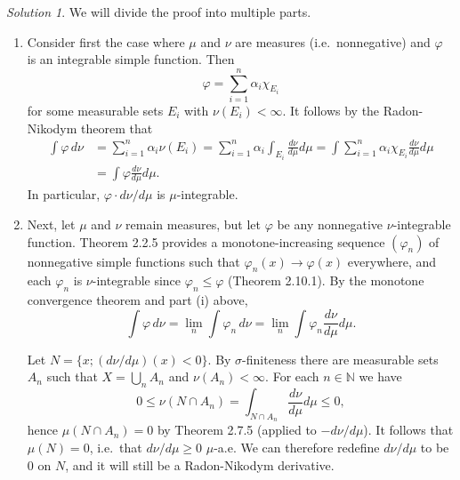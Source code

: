 \documentclass{report}
\newcommand{\bb}[1]{\mathbb{#1}}
\theoremstyle{remark}
\newtheorem*{solution}{Solution}
\begin{document}
\begin{solution}
  We will divide the proof into multiple parts.
  \begin{enumerate}[label=(\roman*)]
    \item Consider first the case where $\mu$ and $\nu$ are measures (i.e.\ nonnegative) and $\varphi$ is an integrable simple function. Then
      \begin{equation*}
        \varphi = \sum_{i=1}^n \alpha_i \chi_{E_i}
      \end{equation*}
      for some measurable sets $E_i$ with $\nu(E_i) < \infty$. It follows by the Radon-Nikodym theorem that
      \begin{equation*}
        \begin{split}
          \int \varphi \, d\nu &= \sum_{i=1}^n \alpha_i \nu(E_i) = \sum_{i=1}^n \alpha_i \int_{E_i} \frac{d\nu}{d\mu} d\mu = \int \sum_{i=1}^n \alpha_i \chi_{E_i} \frac{d\nu}{d\mu} d\mu \\
          &= \int \varphi \frac{d\nu}{d\mu} d\mu.
        \end{split}
      \end{equation*}
      In particular, $\varphi \cdot d\nu/d\mu$ is $\mu$-integrable.

    \item Next, let $\mu$ and $\nu$ remain measures, but let $\varphi$ be any nonnegative $\nu$-integrable function. Theorem 2.2.5 provides a monotone-increasing sequence $(\varphi_n)$ of nonnegative simple functions such that $\varphi_n(x) \to \varphi(x)$ everywhere, and each $\varphi_n$ is $\nu$-integrable since $\varphi_n \le \varphi$ (Theorem 2.10.1). By the monotone convergence theorem and part (i) above,
      \begin{equation*}
        \int \varphi \, d\nu = \lim_n \int \varphi_n \, d\nu = \lim_n \int \varphi_n \frac{d\nu}{d\mu} d\mu.
      \end{equation*}

      Let $N = \{x; (d\nu/d\mu)(x) < 0\}$. By $\sigma$-finiteness there are measurable sets $A_n$ such that $X = \bigcup_n A_n$ and $\nu(A_n) < \infty$. For each $n \in \bb N$ we have
      \begin{equation*}
        0 \le \nu(N \cap A_n) = \int_{N \cap A_n} \frac{d\nu}{d\mu} d\mu \le 0,
      \end{equation*}
      hence $\mu(N \cap A_n) = 0$ by Theorem 2.7.5 (applied to $-d\nu/d\mu$). It follows that $\mu(N) = 0$, i.e.\ that $d\nu/d\mu \ge 0$ $\mu$-a.e. We can therefore redefine $d\nu/d\mu$ to be 0 on $N$, and it will still be a Radon-Nikodym derivative.


\end{enumerate}
\end{solution}
\end{document}
